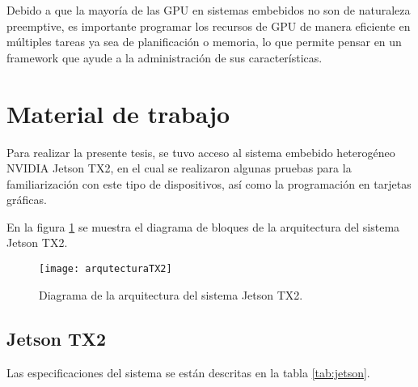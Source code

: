    \vspace{0.3cm}
   
    Debido a que la mayoría de las GPU en sistemas embebidos no son de naturaleza preemptive, es importante programar los recursos de GPU de manera eficiente en múltiples tareas \cite{TX2I} ya sea de planificación o memoria, lo que permite pensar en un framework que ayude a la administración de sus características. 
    
 \section{Material de trabajo}
 
Para realizar la presente tesis, se tuvo acceso al sistema embebido heterogéneo NVIDIA Jetson TX2, en el cual se realizaron algunas pruebas para la familiarización con este tipo de dispositivos, así como la programación en tarjetas gráficas.
            
   \vspace{0.3cm}
   
En la figura \ref{fig:arqutecturaTX2} se muestra el diagrama de bloques de la arquitectura del sistema Jetson TX2.

      \begin{figure}[ht]
      \centering
        \texttt{[image: arqutecturaTX2]}
        \caption{Diagrama de la arquitectura del sistema Jetson TX2\cite{ArqTX2}.}
        \label{fig:arqutecturaTX2}
    \end{figure}

 \subsection{Jetson TX2}
 
    Las especificaciones del sistema se están descritas en la tabla \ref{tab:jetson}.

